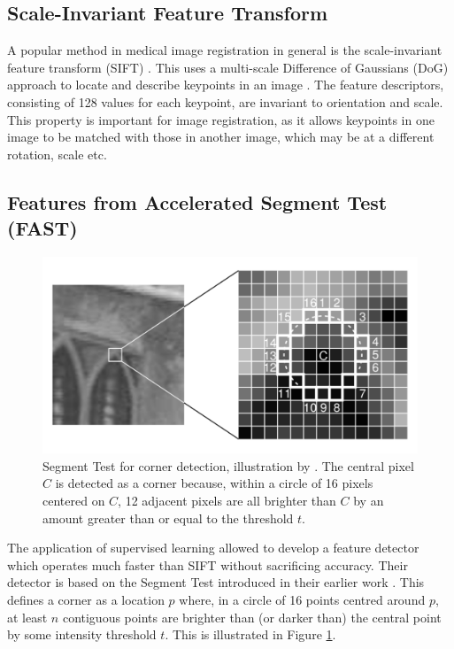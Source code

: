 \documentclass{report}
\begin{document}
\subsection{Scale-Invariant Feature Transform}
A popular method in medical image registration in general is the scale-invariant feature transform (SIFT) \citep{lowe2004distinctive}. This uses a multi-scale Difference of Gaussians (DoG) approach to locate and describe keypoints in an image
. The feature descriptors, consisting of 128 values for each keypoint, are invariant to orientation and scale. This property is important for image registration, as it allows keypoints in one image to be matched with those in another image, which may be at a different rotation, scale etc. 

\subsection{Features from Accelerated Segment Test (FAST)}
\begin{figure}
\centering
\includegraphics[width=5.5in]{Rosten_Corner_Segment_Test.pdf}
\caption{Segment Test for corner detection, illustration by \cite{rosten2005fusing}. The central pixel $C$ is detected as a corner because, within a circle of 16 pixels centered on $C$, 12 adjacent pixels are all brighter than $C$ by an amount greater than or equal to the threshold $t$.}
\label{fig:rosten}
\end{figure}

The application of supervised learning allowed \cite{rosten2006machine} to develop a feature detector which operates much faster than SIFT without sacrificing accuracy. Their detector is based on the Segment Test introduced in their earlier work \citep{rosten2005fusing}. This defines a corner as a location $p$ where, in a circle of 16 points centred around $p$, at least $n$ contiguous points are brighter than (or darker than) the central point by some intensity threshold $t$. This is illustrated in Figure \ref{fig:rosten}.
\end{document}

